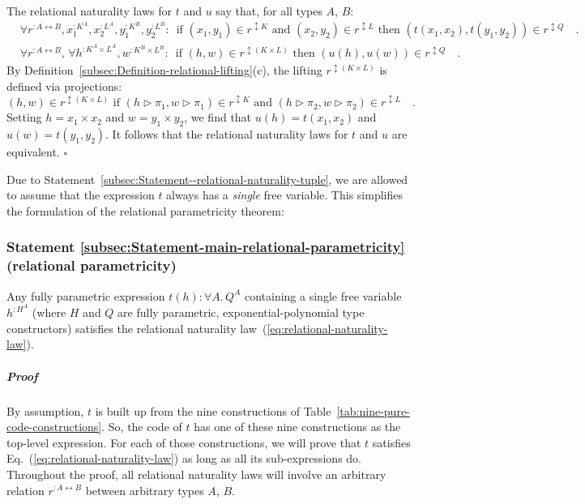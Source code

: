 The relational naturality laws for $t$ and $u$ say that, for all
types $A$, $B$:
\begin{align*}
 & \forall r^{:A\leftrightarrow B},x_{1}^{:K^{A}},x_{2}^{:L^{A}},y_{1}^{:K^{B}},y_{2}^{:L^{B}}:\,\text{ if }(x_{1},y_{1})\in r^{\updownarrow K}\text{ and }(x_{2},y_{2})\in r^{\updownarrow L}\text{ then }(t(x_{1},x_{2}),t(y_{1},y_{2}))\in r^{\updownarrow Q}\quad.\\
 & \forall r^{:A\leftrightarrow B},\,\forall h^{:K^{A}\times L^{A}},w^{:K^{B}\times L^{B}}:\,\text{ if }(h,w)\in r^{\updownarrow(K\times L)}\text{ then }(u(h),u(w))\in r^{\updownarrow Q}\quad.
\end{align*}
By Definition~\ref{subsec:Definition-relational-lifting}(c), the
lifting $r^{\updownarrow(K\times L)}$ is defined via projections:
\[
(h,w)\in r^{\updownarrow(K\times L)}\text{ if }(h\triangleright\pi_{1},w\triangleright\pi_{1})\in r^{\updownarrow K}\text{ and }(h\triangleright\pi_{2},w\triangleright\pi_{2})\in r^{\updownarrow L}\quad.
\]
Setting $h=x_{1}\times x_{2}$ and $w=y_{1}\times y_{2}$, we find
that $u(h)=t(x_{1},x_{2})$ and $u(w)=t(y_{1},y_{2})$. It follows
that the relational naturality laws for $t$ and $u$ are equivalent.
$\square$

Due to Statement~\ref{subsec:Statement--relational-naturality-tuple},
we are allowed to assume that the expression $t$ always has a \emph{single}
free variable. This simplifies the formulation of the relational parametricity
theorem:

\subsubsection{Statement \label{subsec:Statement-main-relational-parametricity}\ref{subsec:Statement-main-relational-parametricity}
(relational parametricity)}

Any fully parametric expression $t(h):\forall A.\,Q^{A}$ containing
a single free variable $h^{:H^{A}}$ (where $H$ and $Q$ are fully
parametric, exponential-polynomial type constructors) satisfies the
relational naturality law~(\ref{eq:relational-naturality-law}).

\subparagraph{Proof }

By assumption, $t$ is built up from the nine constructions of Table~\ref{tab:nine-pure-code-constructions}.
So, the code of $t$ has one of these nine constructions as the top-level
expression. For each of those constructions, we will prove that $t$
satisfies Eq.~(\ref{eq:relational-naturality-law}) as long as all
its sub-expressions do. Throughout the proof, all relational naturality
laws will involve an arbitrary relation $r^{:A\leftrightarrow B}$
between arbitrary types $A$, $B$.

